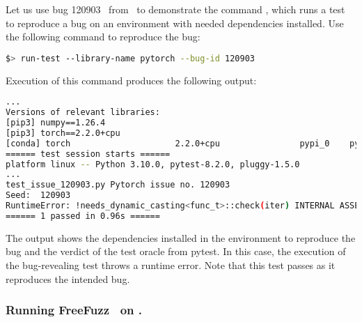 \documentclass[sigconf,screen]{acmart}
\begin{document}


Let us use bug 120903~\cite{torch120903} from \torch\ to demonstrate the
command , which runs a test to reproduce a bug on an
environment with needed dependencies installed. Use the
following command to reproduce the bug:

\begin{lstlisting}[language=bash,basicstyle=\small,]
$> run-test --library-name pytorch --bug-id 120903
\end{lstlisting}

\noindent
Execution of this command produces the following output:

\begin{lstlisting}[language=bash,basicstyle=\small,]
... 
Versions of relevant libraries:
[pip3] numpy==1.26.4
[pip3] torch==2.2.0+cpu
[conda] torch                     2.2.0+cpu                pypi_0    pypi
====== test session starts ======
platform linux -- Python 3.10.0, pytest-8.2.0, pluggy-1.5.0
...
test_issue_120903.py Pytorch issue no. 120903
Seed:  120903
RuntimeError: !needs_dynamic_casting<func_t>::check(iter) INTERNAL ASSERT FAILED at "../aten/src/ATen/native/cpu/Loops.h":310, please report a bug to PyTorch. 
====== 1 passed in 0.96s ======
\end{lstlisting}

The output shows the dependencies installed in the environment to
reproduce the bug and the verdict of the test oracle from pytest. In
this case, the execution of the bug-revealing test throws a runtime
error. Note that this test passes as it reproduces the intended bug.



\subsubsection{Running FreeFuzz~\cite{wei2022free} on \tname.}\label{sec:running-free-fuzz}
\end{document}
